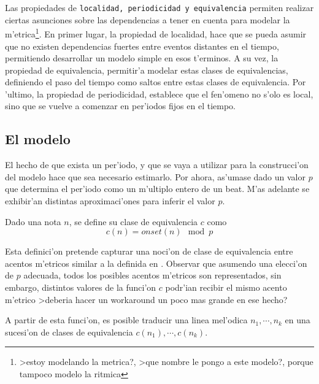 
Las propiedades de \texttt{localidad, periodicidad y equivalencia} permiten realizar ciertas asunciones sobre las dependencias a tener en cuenta para modelar la 
m'etrica\footnote{>estoy modelando la metrica?, >que nombre le pongo a este modelo?, porque tampoco modelo la ritmica}. En primer lugar, la propiedad de localidad, hace
que se pueda asumir que no existen dependencias fuertes entre eventos distantes en el tiempo, permitiendo desarrollar un modelo simple en esos t'erminos. 
A su vez, la propiedad de equivalencia, permitir'a modelar estas clases de equivalencias, definiendo el paso del tiempo como saltos entre estas clases de equivalencia. 
Por 'ultimo, la propiedad de periodicidad, establece que el fen'omeno no s'olo es local, sino que se vuelve a comenzar en per'iodos fijos en el tiempo.

\subsection{El modelo}
El hecho de que exista un per'iodo, y que se vaya a utilizar para la construcci'on del modelo hace que sea necesario estimarlo. Por ahora, as'umase dado un valor 
$p$ que determina el per'iodo como un m'ultiplo entero de un beat. M'as adelante se exhibir'an distintas aproximaci'ones para inferir el valor $p$.

\begin{definition}
Dado una nota $n$, se define su clase de equivalencia $c$ como $$c(n) = onset(n)\mod p$$
\end{definition}

Esta definici'on pretende capturar una noci'on de clase de equivalencia entre acentos m'etricos similar a la definida en \cite{Benjamin84}. Observar que asumendo 
una elecci'on de $p$ adecuada, todos los posibles acentos m'etricos son representados, sin embargo, 
distintos valores de la funci'on $c$ podr'ian recibir el mismo acento m'etrico \alert{>deberia hacer un workaround un poco mas grande en ese hecho?} 


A partir de esta funci'on, es posible traducir una linea mel'odica $n_1,\cdots,n_k$ en una sucesi'on de clases de equivalencia $c(n_1),\cdots,c(n_k)$. 

